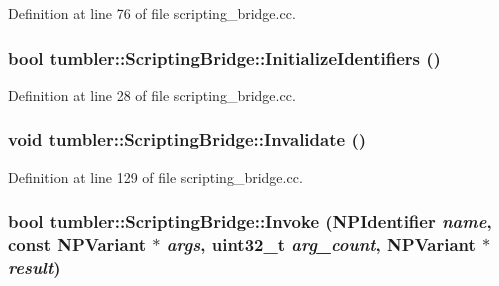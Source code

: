 Definition at line 76 of file scripting\_\-bridge.cc.

\hypertarget{classtumbler_1_1_scripting_bridge_a9653f59bae05d24f2f319a2764a7ce61}{
\subsubsection[{InitializeIdentifiers}]{\setlength{\rightskip}{0pt plus 5cm}bool tumbler::ScriptingBridge::InitializeIdentifiers ()}}
\label{classtumbler_1_1_scripting_bridge_a9653f59bae05d24f2f319a2764a7ce61}


Definition at line 28 of file scripting\_\-bridge.cc.

\hypertarget{classtumbler_1_1_scripting_bridge_a79ca9287d682b30670932c235ce025b4}{
\subsubsection[{Invalidate}]{\setlength{\rightskip}{0pt plus 5cm}void tumbler::ScriptingBridge::Invalidate ()}}
\label{classtumbler_1_1_scripting_bridge_a79ca9287d682b30670932c235ce025b4}


Definition at line 129 of file scripting\_\-bridge.cc.

\hypertarget{classtumbler_1_1_scripting_bridge_a70638ad7da4726fb8ccbc6f49868fafc}{
\subsubsection[{Invoke}]{\setlength{\rightskip}{0pt plus 5cm}bool tumbler::ScriptingBridge::Invoke ({\bf NPIdentifier} {\em name}, \/  const {\bf NPVariant} $\ast$ {\em args}, \/  uint32\_\-t {\em arg\_\-count}, \/  {\bf NPVariant} $\ast$ {\em result})}}
\label{classtumbler_1_1_scripting_bridge_a70638ad7da4726fb8ccbc6f49868fafc}


